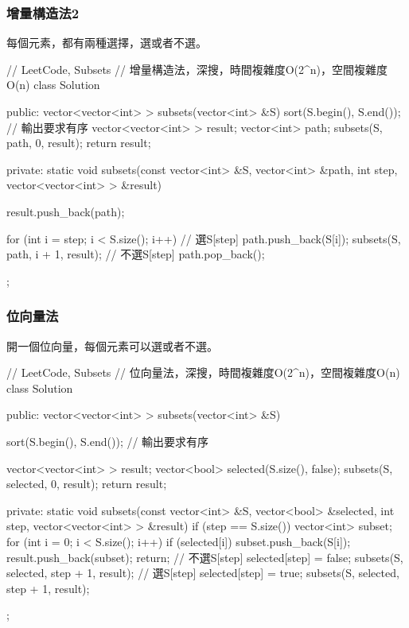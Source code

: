 \subsubsection{增量構造法2}
每個元素，都有兩種選擇，選或者不選。

\begin{Code}
// LeetCode, Subsets
// 增量構造法，深搜，時間複雜度O(2^n)，空間複雜度O(n)
class Solution {
public:
    vector<vector<int> > subsets(vector<int> &S) {
        sort(S.begin(), S.end());  // 輸出要求有序
        vector<vector<int> > result;
        vector<int> path;
        subsets(S, path, 0, result);
        return result;
    }

private:
    static void subsets(const vector<int> &S, vector<int> &path, int step,
                        vector<vector<int> > &result) {
        result.push_back(path);

        for (int i = step; i < S.size(); i++) {
            // 選S[step]
            path.push_back(S[i]);
            subsets(S, path, i + 1, result);
            // 不選S[step]
            path.pop_back();
        }
    }
};
\end{Code}

\subsubsection{位向量法}
開一個位向量，每個元素可以選或者不選。

\begin{Code}
// LeetCode, Subsets
// 位向量法，深搜，時間複雜度O(2^n)，空間複雜度O(n)
class Solution {
public:
    vector<vector<int> > subsets(vector<int> &S) {
        sort(S.begin(), S.end());  // 輸出要求有序

        vector<vector<int> > result;
        vector<bool> selected(S.size(), false);
        subsets(S, selected, 0, result);
        return result;
    }

private:
    static void subsets(const vector<int> &S, vector<bool> &selected, int step,
            vector<vector<int> > &result) {
        if (step == S.size()) {
            vector<int> subset;
            for (int i = 0; i < S.size(); i++) {
                if (selected[i]) subset.push_back(S[i]);
            }
            result.push_back(subset);
            return;
        }
        // 不選S[step]
        selected[step] = false;
        subsets(S, selected, step + 1, result);
        // 選S[step]
        selected[step] = true;
        subsets(S, selected, step + 1, result);
    }
};
\end{Code}


